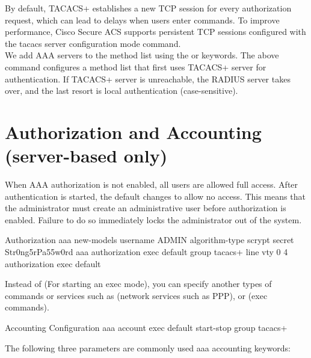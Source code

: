 
By default, TACACS+ establishes a new TCP session for every authorization request, which can lead to delays when users enter commands. To improve performance, Cisco Secure ACS supports persistent TCP sessions configured with the  tacacs server configuration mode command. \\

We add AAA servers to the method list using the  or  keywords. The above command configures a method list that first uses TACACS+ server for authentication. If TACACS+ server is unreachable, the RADIUS server takes over, and the last resort is local authentication (case-sensitive).

\section{Authorization and Accounting (server-based only)}

When AAA authorization is not enabled, all users are allowed full access. After authentication is started, the default changes to allow no access. This means that the administrator must create an administrative user before authorization is enabled. Failure to do so immediately locks the administrator out of the system.

\begin{sexylisting}{Authorization}
aaa new-models
username ADMIN algorithm-type scrypt secret Str0ng5rPa55w0rd
aaa authorization exec default group tacacs+
line vty 0 4
	authorization exec default
\end{sexylisting}%

Instead of  (For starting an exec mode), you can specify another  types of commands or services such as  (network services such as PPP), or  (exec commands).

\begin{sexylisting}{Accounting Configuration}
aaa account exec default start-stop group tacacs+
\end{sexylisting}

The following three parameters are commonly used aaa accounting keywords:

